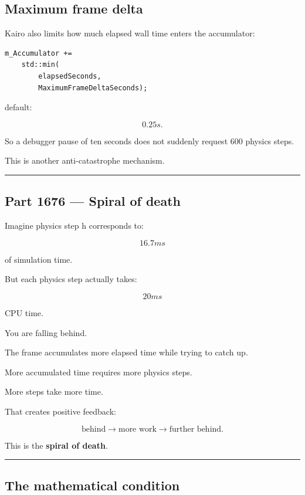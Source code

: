 \subsection{Maximum frame delta}\label{06-engine-ii-ch037-maximum-frame-delta}

Kairo also limits how much elapsed wall time enters the accumulator:

\begin{verbatim}
m_Accumulator +=
    std::min(
        elapsedSeconds,
        MaximumFrameDeltaSeconds);
\end{verbatim}

default:

\[
0.25s.
\]

So a debugger pause of ten seconds does not suddenly request 600 physics steps.

This is another anti-catastrophe mechanism.

\begin{center}\rule{0.5\linewidth}{0.5pt}\end{center}

\subsection{Part 1676 --- Spiral of death}\label{06-engine-ii-ch037-part-1676-spiral-of-death}

Imagine physics step h corresponds to:

\[
16.7ms
\]

of simulation time.

But each physics step actually takes:

\[
20ms
\]

CPU time.

You are falling behind.

The frame accumulates more elapsed time while trying to catch up.

More accumulated time requires more physics steps.

More steps take more time.

That creates positive feedback:

\[
\boxed{
\text{behind}
\rightarrow
\text{more work}
\rightarrow
\text{further behind}.
}
\]

This is the \textbf{spiral of death}.

\begin{center}\rule{0.5\linewidth}{0.5pt}\end{center}

\subsection{The mathematical condition}\label{06-engine-ii-ch037-the-mathematical-condition}


